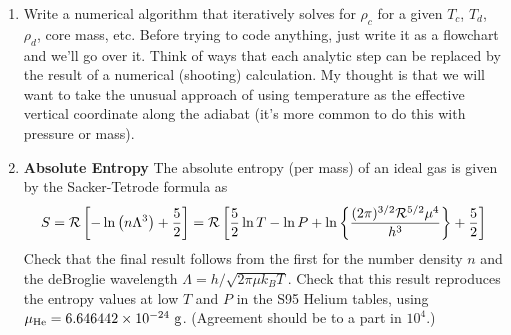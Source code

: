 \documentclass[11pt]{article}
\newcommand{\Rg}{\mathcal{R}}
\begin{document}
\begin{enumerate}[resume]
\item Write a numerical algorithm that iteratively solves for $\rho_c$ for a given $T_c$, $T_d$, $\rho_d$, core mass, etc.  Before trying to code anything, just write it as a flowchart and we'll go over it.  Think of ways that each analytic step can be replaced by the result of a numerical (shooting) calculation.  My thought is that we will want to take the unusual approach of using temperature as the effective vertical coordinate along the adiabat (it's more common to do this with pressure or mass).

\item {\bf Absolute Entropy} The absolute entropy (per mass) of an ideal gas is given by the Sacker-Tetrode formula as
\begin{equation}
S = \Rg \left[- \ln\left( n \Lambda^3\right) + {5 \over 2} \right] = \Rg \left[{5 \over 2} \ln T - \ln P +  \ln \left\{ (2 \pi)^{3/2} \Rg^{5/2} \mu^4 \over h^3 \right\} + {5 \over 2}\right] 
\end{equation} 
Check that the final result follows from the first for the number density $n$ and the deBroglie wavelength $\Lambda = h/\sqrt{2 \pi \mu k_B T}$.  Check that this result reproduces the entropy values at low $T$ and $P$ in the S95 Helium tables, using $\mu_{\rm He} = 6.646442\times 10^{-24}~{\rm g}$.  (Agreement should be to a part in $10^4$.)
\end{enumerate}
\end{document}
